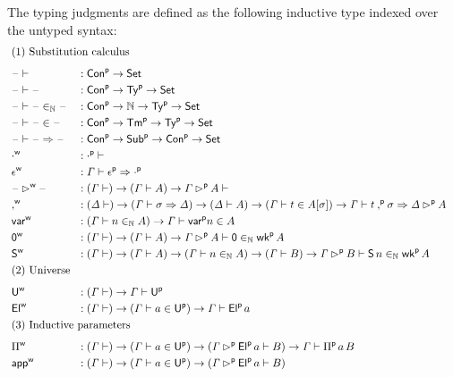 \begin{definition}\label{def:typing_judgments}
  The typing judgments are defined as the following inductive type indexed over the
  untyped syntax:
\begin{alignat*}{5}
  & \rlap{(1) Substitution calculus} \\[0.5em]
  & \blank \vdash && : \Conu\ra \Set \\
  & \blank \vdash \blank  && : \Conu\ra \Tyu\ra\Set \\
  & \blank \vdash \blank \invar \blank  && : \Conu\ra \N \ra \Tyu\ra \Set \\
  & \blank \vdash \blank \in \blank  && : \Conu\ra \Tmu\ra \Tyu\ra \Set \\
  & \blank \vdash \blank \Rightarrow \blank  && : \Conu\ra \Subu \ra \Conu\ra \Set \\
  & \emptyw && : \emptyu \vdash \\
  & \epsilonw && : \GG\vdash \epsilonu \Rightarrow \emptyu \\
  & \blank\extw\blank && : ( \GG\vdash )  \ra  (\GG\vdash A)  \ra
  \GG\extu A \vdash \\
  & \consw && :
    (\GD \vdash) \ra
    (\GG\vdash \sigma \Rightarrow\GD)\ra
    ( \GD \vdash A) \ra
    ( \GG \vdash t \in A[\sigma]) \ra
    \GG \vdash t \consu \sigma \Rightarrow \GD\extu A
   \\
  & \varw  && : (\GG \vdash n \invar A) \ra \GG \vdash \varu n \in A \\
  & \vzw  && : (\GG\vdash)\ra(\GG\vdash A)\ra\GG \extu  A \vdash \mathsf{0} \invar \wku \, A \\
  & \vsw  && : (\GG\vdash)\ra(\GG\vdash A)\ra(\GG \vdash n \invar A) \ra (\GG \vdash B) \ra \GG \extu  B
  \vdash \mathsf{S}\,n \invar \wku \, A \\
  & \rlap{(2) Universe} \\[0.5em]
  & \Uw && : (\GG \vdash)\ra \GG \vdash \Uu \\
  & \Elw && : (\GG \vdash)\ra (\GG \vdash a \in \Uu)\ra\GG \vdash \Elu\,a \\
  & \rlap{(3) Inductive parameters} \\[0.5em]
\  & \Piw && :
    (\GG \vdash)\ra (\GG \vdash a \in \Uu)\ra(\GG \extu
  \Elu\,a \vdash B)\ra\GG \vdash \Piu \, a \, B \\
  & \appw && :
    (\GG \vdash)\ra (\GG \vdash a \in \Uu)\ra(\GG \extu
    \Elu\,a \vdash B)
    \\

\end{alignat*}
\end{definition}
